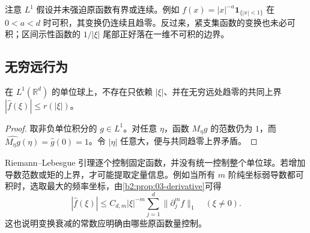 \ProseParagraphBreak

注意 \(L^1\) 假设并未强迫原函数有界或连续。例如 \(f(x)=|x|^{-a}\mathbf1_{\{|x|<1\}}\) 在 \(0<a<d\) 时可积，其变换仍连续且趋零。反过来，紧支集函数的变换也未必可积；区间示性函数的 \(1/|\xi|\) 尾部正好落在一维不可积的边界。

\subsection{无穷远行为}
\label{b2:subsec:030203}

\begin{proposition}\label{b2:prop:03-no-uniform-decay}
在 \(L^1(\mathbb R^d)\) 的单位球上，不存在只依赖 \(|\xi|\)、并在无穷远处趋零的共同上界 \(|\widehat f(\xi)|\leq r(|\xi|)\)。
\end{proposition}
\begin{proof}
取非负单位积分的 \(g\in L^1\)。对任意 \(\eta\)，函数 \(M_\eta g\) 的范数仍为 \(1\)，而 \(\widehat{M_\eta g}(\eta)=\widehat g(0)=1\)。令 \(|\eta|\) 任意大，便与共同趋零上界矛盾。
\end{proof}

Riemann--Lebesgue 引理逐个控制固定函数，并没有统一控制整个单位球。若增加导数范数或矩的上界，才可能提取定量信息。例如当所有 \(m\) 阶纯坐标弱导数都可积时，选取最大的频率坐标，由\cref{b2:prop:03-derivative}可得
\[
 |\widehat f(\xi)|\leq C_{d,m}|\xi|^{-m}\sum_{j=1}^d\|\partial_j^m f\|_1
 \quad(\xi\ne0).
\]
这也说明变换衰减的常数应明确由哪些原函数量控制。
